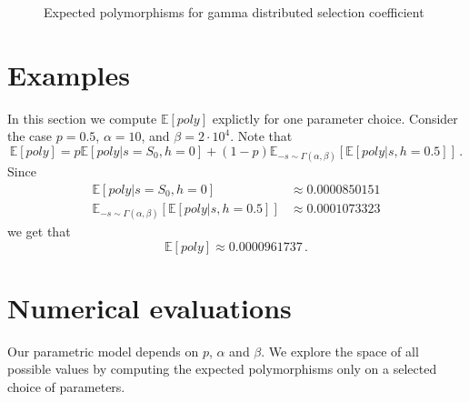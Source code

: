 \documentclass[a4paper,11pt]{article}
\newcommand{\EE}{\mathbb{E}}
\newcommand{\1}{\mathds{1}}
\theoremstyle{plain} %
\theoremstyle{definition} %
\theoremstyle{remark} %
\begin{document}
\begin{figure}[h]
	\centering
	\pgfplotsset{width=7cm}
	\caption{Expected polymorphisms for gamma distributed selection coefficient}
	\label{Figure: Approximation alpah = 1}
\end{figure}


\section{Examples}

In this section we compute $\EE[poly]$ explictly for one parameter choice. 
Consider the case $p = 0.5$, $\alpha = 10$, and $\beta = 2 \cdot 10^4$.
Note that
\[
	\EE[ poly ] = p \EE[ poly | s = S_0, h = 0] + (1 - p) \EE_{-s \sim \Gamma(\alpha, \beta)} [ \EE[ poly | s, h = 0.5] ] \,.
\]
Since
\begin{align*}
	\EE[ poly | s = S_0, h = 0] 
		&\approx 0.0000850151 \\
	\EE_{-s \sim \Gamma(\alpha, \beta)} [ \EE[ poly | s, h = 0.5] ]
		&\approx 0.0001073323
\end{align*}
we get that
\[
	\EE[ poly ] \approx 0.0000961737 \,.
\]







\section{Numerical evaluations}

Our parametric model depends on $p$, $\alpha$ and $\beta$.
We explore the space of all possible values by computing the expected polymorphisms only on a selected choice of parameters.
\end{document}
